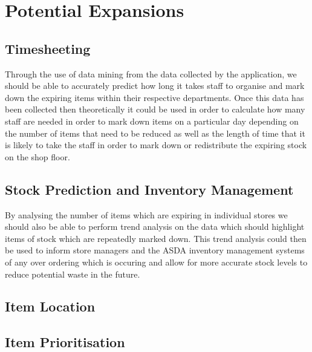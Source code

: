 \documentclass[a4paper,11pt]{report}
\begin{document}
\section{Potential Expansions}

\subsection{Timesheeting}
Through the use of data mining from the data collected by the application, we should be able to accurately predict
how long it takes staff to organise and mark down the expiring items within their respective departments. Once 
this data has been collected then theoretically it could be used in order to calculate how many staff are needed 
in order to mark down items on a particular day depending on the number of items that need to be reduced as well 
as the length of time that it is likely to take the staff in order to mark down or redistribute the expiring stock
on the shop floor. 

\subsection{Stock Prediction and Inventory Management}

By analysing the number of items which are expiring in individual stores we should also be able to perform trend 
analysis on the data which should highlight items of stock which are repeatedly marked down. This trend analysis 
could then be used to inform store managers and the ASDA inventory management systems of any over ordering which is 
occuring and allow for more accurate stock levels to reduce potential waste in the future.

\subsection{Item Location}

\subsection{Item Prioritisation}




\end{document}
